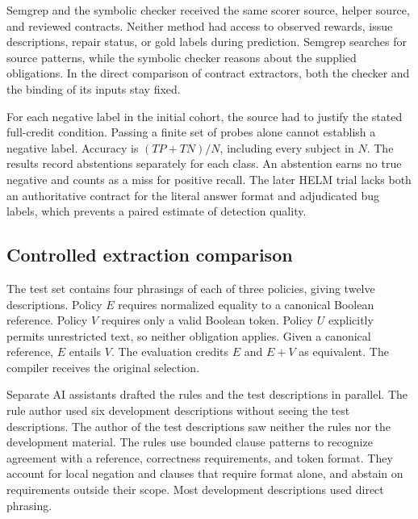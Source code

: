\documentclass[sigconf]{acmart}
\begin{document}
Semgrep and the symbolic checker received the same scorer source, helper source, and reviewed contracts. Neither method had access to observed rewards, issue descriptions, repair status, or gold labels during prediction. Semgrep searches for source patterns, while the symbolic checker reasons about the supplied obligations. In the direct comparison of contract extractors, both the checker and the binding of its inputs stay fixed.

For each negative label in the initial cohort, the source had to justify the stated full-credit condition. Passing a finite set of probes alone cannot establish a negative label. Accuracy is $(TP+TN)/N$, including every subject in $N$. The results record abstentions separately for each class. An abstention earns no true negative and counts as a miss for positive recall. The later HELM trial lacks both an authoritative contract for the literal answer format and adjudicated bug labels, which prevents a paired estimate of detection quality.

\subsection{Controlled extraction comparison}

The test set contains four phrasings of each of three policies, giving twelve descriptions. Policy $E$ requires normalized equality to a canonical Boolean reference. Policy $V$ requires only a valid Boolean token. Policy $U$ explicitly permits unrestricted text, so neither obligation applies. Given a canonical reference, $E$ entails $V$. The evaluation credits $E$ and $E+V$ as equivalent. The compiler receives the original selection.

Separate AI assistants drafted the rules and the test descriptions in parallel. The rule author used six development descriptions without seeing the test descriptions. The author of the test descriptions saw neither the rules nor the development material. The rules use bounded clause patterns to recognize agreement with a reference, correctness requirements, and token format. They account for local negation and clauses that require format alone, and abstain on requirements outside their scope. Most development descriptions used direct phrasing.
\end{document}
